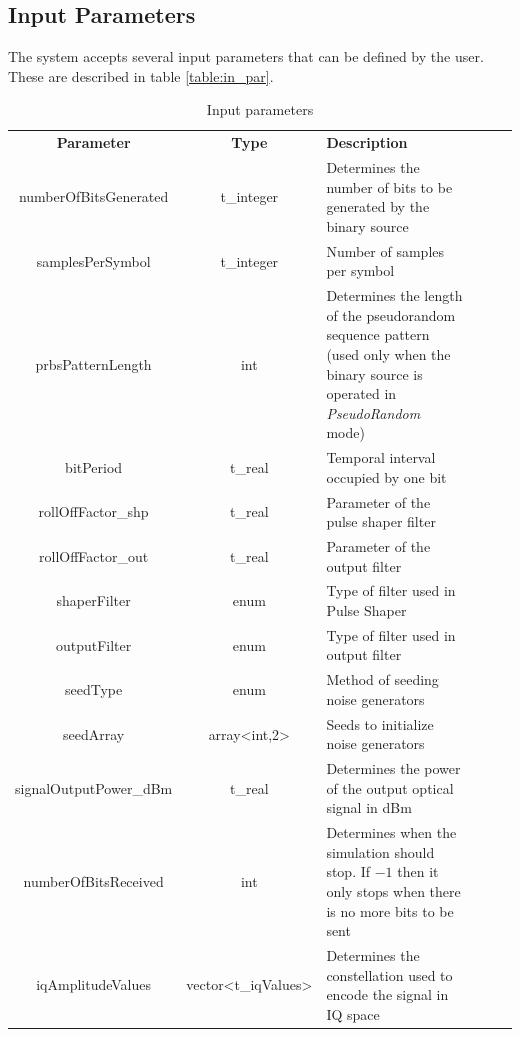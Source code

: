 \subsection*{Input Parameters}

The system accepts several input parameters that can be defined by the user. These are described in table \ref{table:in_par}.

\begin{table}[H]
	\centering
	\caption{Input parameters}
	\begin{tabular}{|c|c|p{70mm}|ccp{70mm}}
		\cline{1-3}
		\textbf{Parameter} & \textbf{Type} & \textbf{Description} &    \\ \cline{1-3}
		numberOfBitsGenerated & t\_integer & Determines the number of bits to be generated by the binary source  &    \\ \cline{1-3}
		samplesPerSymbol & t\_integer & Number of samples per symbol &    \\ \cline{1-3}
		prbsPatternLength & int & Determines the length of the pseudorandom sequence pattern (used only when the binary source is operated in \textit{PseudoRandom} mode) &    \\ \cline{1-3}
		bitPeriod & t\_real & Temporal interval occupied by one bit &    \\ \cline{1-3}
		rollOffFactor\_shp & t\_real & Parameter of the pulse shaper filter &    \\ \cline{1-3}
		rollOffFactor\_out & t\_real & Parameter of the output filter &    \\ \cline{1-3}
		shaperFilter & enum & Type of filter used in Pulse Shaper &    \\ \cline{1-3}
		outputFilter & enum & Type of filter used in output filter &    \\ \cline{1-3}
		seedType & enum & Method of seeding noise generators &    \\ \cline{1-3}
		seedArray & array<int,2> & Seeds to initialize noise generators &    \\ \cline{1-3}
		signalOutputPower\_dBm & t\_real & Determines the power of the output optical signal in dBm &  \\ \cline{1-3}
		numberOfBitsReceived & int &   Determines when the simulation should stop. If $-1$ then it only stops when there is no more bits to be sent&   \\ \cline{1-3}
		iqAmplitudeValues & vector<t\_iqValues> & Determines the constellation used to encode the signal in IQ space &    \\ \cline{1-3}

\end{tabular}
\end{table}
